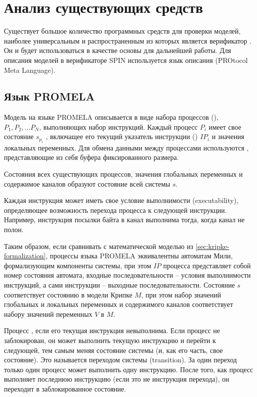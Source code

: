 \chapter{Анализ существующих средств}
\label{cha:analogues}

Существует большое количество программных средств для проверки моделей, наиболее
универсальным и распространенным из которых является верификатор 
\cite{SpinRoot}. Он и будет использоваться в качестве основы для дальнейшей работы. Для
описания моделей в верификаторе SPIN используется язык описания  (PROtocol
  Meta Language).

\section{Язык PROMELA}
\label{sec:promela}

Модель на языке PROMELA описывается в виде набора процессов (), $P_1, P_2,
... P_N$, выполняющих набор инструкций. Каждый процесс $P_i$ имеет свое состояние
$s_{p_i}$ , включащее его текущий указатель инструкции () $IP_i$
и значения локальных переменных. Для обмена данными между процессами используются
, представляющие из себя буфера фиксированного размера.

Состояния всех существующих процессов, значения глобальных переменных и содержимое каналов
образуют состояние всей системы $s$.

Каждая инструкция может иметь свое условие выполнимости (executability), определяющее
возможность перехода процесса к следующей инструкции. Например, инструкция посылки байта в
канал выполнима тогда, когда канал не полон.

Таким образом, если сравнивать с математической моделью из \ref{sec:kripke-formalization},
процессы языка PROMELA эквивалентны автоматам Мили, формализующим компоненты системы, при
этом $IP$ процесса представляет собой номер состояния автомата, входные последовательности
-- условия выполнимости инструкций, а сами инструкции -- выходные
последовательности. Состояние $s$ соответствует состоянию в модели Крипке $M$, при этом набор
значений глобальных и локальных переменных и содержимого каналов соответствует набору
значений переменных $V$ в $M$.

Процесс , если его текущая инструкция невыполнима. Если процесс не
заблокирован, он может выполнить текущую инструкцию и перейти к следующей, тем самым меняя
состояние системы (и, как его часть, свое состояние). Это называется переходом системы
(transition). За один переход только один процесс может выполнить одну инструкцию. После
того, как процесс выполняет последнюю инструкцию (если это не инструкция перехода), он
переходит в заблокированное состояние.

